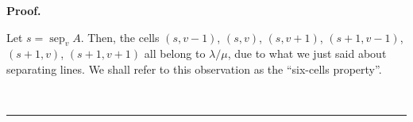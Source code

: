 \documentclass[12pt]{article}
\theoremstyle{plain}
\theoremstyle{definition}
\newenvironment{proof}[1][Proof]{\noindent\textbf{#1.} }{\ \rule{0.5em}{0.5em}}
\def\lm{{\lambda/\mu}}
\begin{document}
\begin{proof}
%

Let $s=\operatorname*{sep}\nolimits_{v}A$.
Then, the cells
$\left(s, v-1\right)$, $\left(s, v\right)$, $\left(s, v+1\right)$,
$\left(s+1, v-1\right)$, $\left(s+1, v\right)$, $\left(s+1, v+1\right)$
all belong to $\lm$, due to what we just said about separating
lines. We shall refer to this observation as the
``six-cells property''.


\end{proof}
\end{document}
